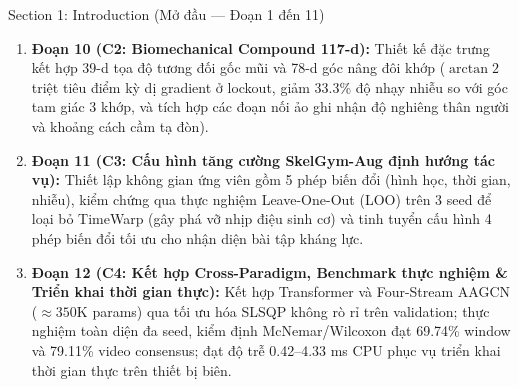 \documentclass[10pt,a4paper]{article}
\begin{document}
\begin{secbox}{Section 1: Introduction (Mở đầu — Đoạn 1 đến 11)}
\begin{enumerate}[leftmargin=*, itemsep=2pt, topsep=1pt]
    \item \textbf{Đoạn 10 (C2: Biomechanical Compound 117-d):} Thiết kế đặc trưng kết hợp 39-d tọa độ tương đối gốc mũi và 78-d góc nâng đôi khớp ($\arctan2$ triệt tiêu điểm kỳ dị gradient ở lockout, giảm 33.3\% độ nhạy nhiễu so với góc tam giác 3 khớp, và tích hợp các đoạn nối ảo ghi nhận độ nghiêng thân người và khoảng cách cầm tạ đòn).
    \item \textbf{Đoạn 11 (C3: Cấu hình tăng cường SkelGym-Aug định hướng tác vụ):} Thiết lập không gian ứng viên gồm 5 phép biến đổi (hình học, thời gian, nhiễu), kiểm chứng qua thực nghiệm Leave-One-Out (LOO) trên 3 seed để loại bỏ TimeWarp (gây phá vỡ nhịp điệu sinh cơ) và tinh tuyển cấu hình 4 phép biến đổi tối ưu cho nhận diện bài tập kháng lực.
    \item \textbf{Đoạn 12 (C4: Kết hợp Cross-Paradigm, Benchmark thực nghiệm \& Triển khai thời gian thực):} Kết hợp Transformer và Four-Stream AAGCN ($\approx 350\text{K}$ params) qua tối ưu hóa SLSQP không rò rỉ trên validation; thực nghiệm toàn diện đa seed, kiểm định McNemar/Wilcoxon đạt 69.74\% window và 79.11\% video consensus; đạt độ trễ 0.42--4.33 ms CPU phục vụ triển khai thời gian thực trên thiết bị biên.
\end{enumerate}
\end{secbox}
\end{document}

